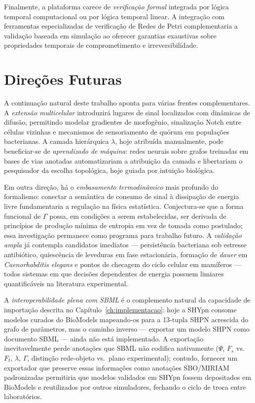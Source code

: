 Finalmente, a plataforma carece de \emph{verificação formal} integrada por
lógica temporal computacional ou por lógica temporal linear. A integração
com ferramentas especializadas de verificação de Redes de Petri
complementaria a validação baseada em simulação ao oferecer garantias
exaustivas sobre propriedades temporais de comprometimento e
irreversibilidade.

\section{Direções Futuras}
\label{sec:direcoes-futuras}

A continuação natural deste trabalho aponta para várias frentes
complementares. A \emph{extensão multicelular} introduzirá lugares de sinal
localizados com dinâmicas de difusão, permitindo modelar gradientes de
morfogênio, sinalização Notch entre células vizinhas e mecanismos de
sensoriamento de quórum em populações bacterianas. A camada hierárquica $\lambda$,
hoje atribuída manualmente, pode beneficiar-se de \emph{aprendizado
de máquina}: redes neurais sobre grafos treinadas em bases de vias
anotadas automatizariam a atribuição da camada e libertariam o pesquisador
da escolha topológica, hoje guiada por intuição biológica.

Em outra direção, há o \emph{embasamento termodinâmico} mais profundo do
formalismo: conectar a semântica de consumo de sinal à dissipação de energia
livre fundamentaria a regulação na física estatística. Conjectura-se que a
forma funcional de $\Gamma$ possa, em condições a serem estabelecidas, ser
derivada de princípios de produção mínima de entropia em vez de tomada como
postulado; essa investigação permanece como programa para trabalho futuro. A \emph{validação ampla} já
contempla candidatos imediatos --- persistência bacteriana sob estresse
antibiótico, quiescência de leveduras em fase estacionária, formação de
\textit{dauer} em \textit{Caenorhabditis elegans} e pontos de checagem do
ciclo celular em mamíferos --- todos sistemas em que decisões dependentes
de energia possuem limiares quantificáveis na literatura experimental.

A \emph{interoperabilidade plena com SBML} é o complemento natural da
capacidade de importação descrita no Capítulo~\ref{ch:implementacao}: hoje
a SHYpn consome modelos curados do BioModels mapeando-os para a 13-tupla
SHPN acrescida do grafo de parâmetros, mas o caminho inverso --- exportar
um modelo SHPN como documento SBML --- ainda não está implementado. A
exportação inevitavelmente perde anotações que SBML não codifica
nativamente ($\Psi$, $F_s$ vs.\ $F_t$, $\lambda$, $\Gamma$, distinção
rede-objeto vs.\ plano experimental); contudo, fornecer um exportador que
preserve essas informações como anotações SBO/MIRIAM padronizadas
permitiria que modelos validados em SHYpn fossem depositados em
BioModels e reutilizados por outros simuladores, fechando o ciclo de
troca entre laboratórios.

